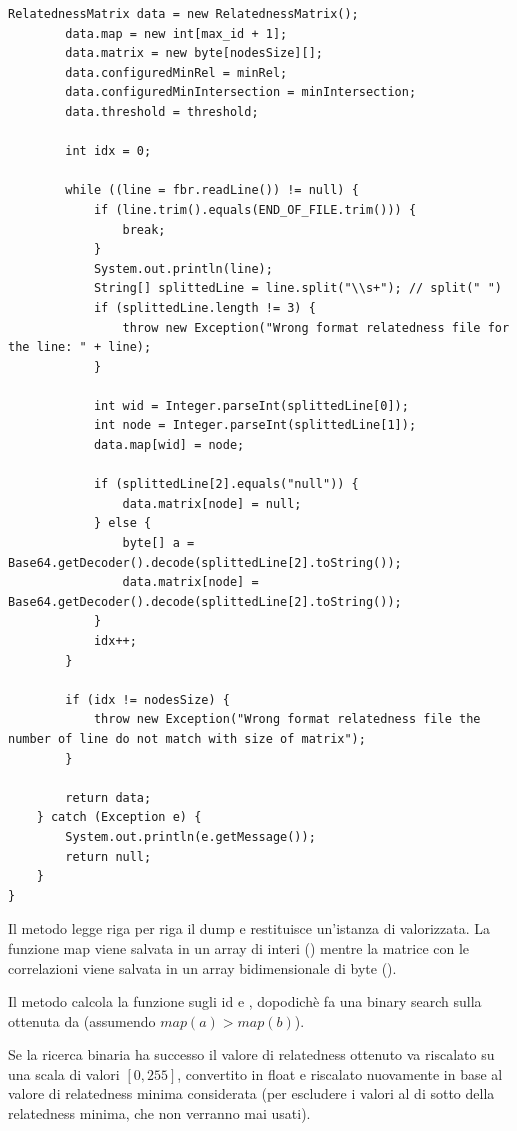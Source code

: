 \begin{lstlisting}[style=JavaStyle, caption=Implentazione nativa]
        RelatednessMatrix data = new RelatednessMatrix();
        data.map = new int[max_id + 1];
        data.matrix = new byte[nodesSize][];
        data.configuredMinRel = minRel;
        data.configuredMinIntersection = minIntersection;
        data.threshold = threshold;

        int idx = 0;

        while ((line = fbr.readLine()) != null) {
            if (line.trim().equals(END_OF_FILE.trim())) {
                break;
            }
            System.out.println(line);
            String[] splittedLine = line.split("\\s+"); // split(" ")
            if (splittedLine.length != 3) {
                throw new Exception("Wrong format relatedness file for the line: " + line);
            }

            int wid = Integer.parseInt(splittedLine[0]);
            int node = Integer.parseInt(splittedLine[1]);
            data.map[wid] = node;

            if (splittedLine[2].equals("null")) {
                data.matrix[node] = null;
            } else {
                byte[] a = Base64.getDecoder().decode(splittedLine[2].toString()); 
                data.matrix[node] = Base64.getDecoder().decode(splittedLine[2].toString());
            }
            idx++;
        }
        
        if (idx != nodesSize) {
            throw new Exception("Wrong format relatedness file the number of line do not match with size of matrix");
        }
        
        return data;
    } catch (Exception e) {
        System.out.println(e.getMessage());
        return null;
    }
}
\end{lstlisting}

Il metodo  legge riga per riga il dump e restituisce un'istanza di  valorizzata. 
La funzione map viene salvata in un array di interi () mentre la matrice con le correlazioni viene salvata in un 
array bidimensionale di byte ().

Il metodo  calcola la funzione  sugli id  e , dopodichè fa una binary search sulla  
ottenuta da  (assumendo $map(a) > map(b)$). 

Se la ricerca binaria ha successo il valore di relatedness ottenuto va riscalato su una scala di valori $[0, 255]$, 
convertito in float e riscalato nuovamente in base al valore di relatedness minima considerata (per escludere i valori al di sotto della relatedness minima,
che non verranno mai usati).  

